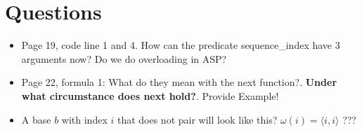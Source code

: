 \documentclass[runningheads]{llncs}
\begin{document}
\section{Questions}

\begin{itemize}
    \item Page 19, code line 1 and 4. How can the predicate sequence\_index have 3 arguments now? Do we do overloading in ASP?
    \item Page 22, formula 1: What do they mean with the next function?. \textbf{Under what circumstance does next hold?}. Provide Example!
    \item A base $b$ with index $i$ that does not pair will look like this? $\omega(i) = \langle i, i \rangle$ ???
\end{itemize}



\end{document}
